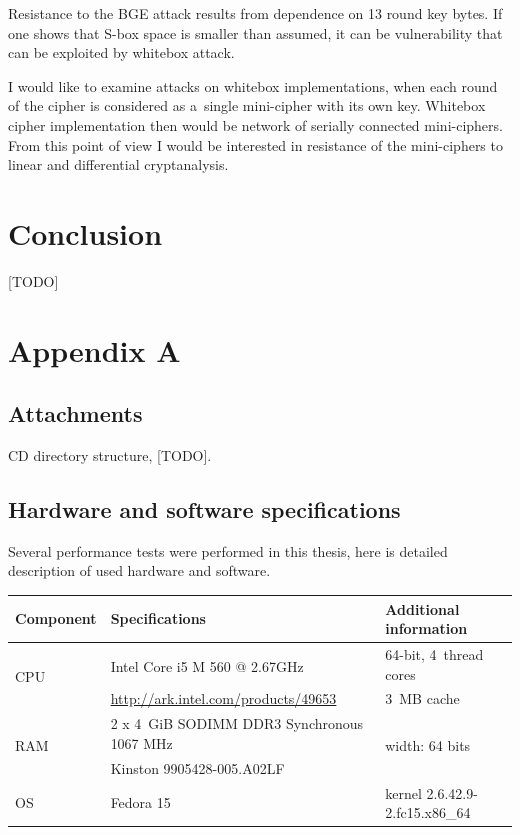 \documentclass[11pt,oneside,final]{fithesis2}
\begin{document}
    Resistance to the BGE attack results from dependence on 13 round key bytes. If one shows that S-box space is smaller than assumed, it can be vulnerability 
    that can be exploited by whitebox attack. 

    I would like to examine attacks on whitebox implementations, when each round of the cipher is considered as a~single mini-cipher with its own key. Whitebox
    cipher implementation then would be network of serially connected mini-ciphers. From this point of view I would be interested in resistance of the mini-ciphers
    to linear and differential cryptanalysis. 

\chapter{Conclusion}\label{sec:conclusion}   
    [TODO]
    
\appendix

\chapter{Appendix A}
    \section{Attachments}\label{appendix:attach}
    CD directory structure, [TODO].
    
    
    \section{Hardware and software specifications}\label{appendix:hw_spec}
    Several performance tests were performed in this thesis, here is detailed description of used hardware and software.
    
    \begin{center}
    \begin{table}[ht]
    \begin{tabular}{ l | l | l }
	\hline
	Component & Specifications & Additional information \\
	\hline
	\hline
	\multirow{2}{*}{CPU} & Intel\textsuperscript{\textregistered} Core\textsuperscript{\texttrademark} i5 M 560 @ 2.67GHz & 64-bit, 4~thread cores  \\
	                     & \url{http://ark.intel.com/products/49653}                                                      & 3~MB cache              \\ \hline
	\multirow{2}{*}{RAM} & 2 x 4~GiB SODIMM DDR3 Synchronous 1067 MHz                                                     & \multirow{2}{*}{width: 64 bits}    \\
	                     & Kinston 9905428-005.A02LF                                                                      &    \\ \hline
	OS		     & Fedora 15										      & kernel 2.6.42.9-2.fc15.x86\_64 \\ \hline 
    \end{tabular}
    \end{table}
    \end{center}
    
\end{document}
